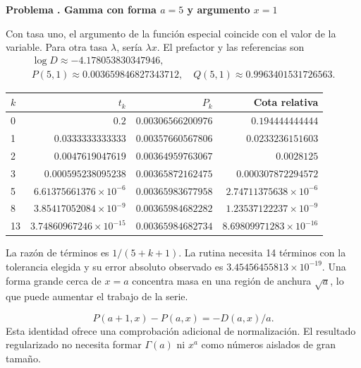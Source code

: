 \documentclass[11pt,a4paper]{article}
\theoremstyle{definition}
\newcounter{problema}
\newenvironment{resuelto}[1]{\refstepcounter{problema}\par\medskip\Needspace{6\baselineskip}\textbf{Problema \theproblema. #1}\par}{\par\medskip}
\begin{document}
\begin{resuelto}{Gamma con forma $a=5$ y argumento $x=1$}
Con tasa uno, el argumento de la función especial coincide con el valor de la variable. Para otra tasa $\lambda$, sería $\lambda x$. El prefactor y las referencias son
\[
\begin{gathered}
\log D\approx-4.178053830347946,\\
P(5,1)\approx0.003659846827343712,\quad Q(5,1)\approx0.9963401531726563.
\end{gathered}
\]

\begin{center}\small\begin{tabular}{lrrr}
\toprule
$k$ & $t_k$ & $P_k$ & Cota relativa\\\midrule
0 & $0.2$ & $0.00306566200976$ & $0.194444444444$\\
1 & $0.0333333333333$ & $0.00357660567806$ & $0.0233236151603$\\
2 & $0.0047619047619$ & $0.00364959763067$ & $0.0028125$\\
3 & $0.000595238095238$ & $0.00365872162475$ & $0.000307872294572$\\
5 & $6.61375661376\times10^{-6}$ & $0.00365983677958$ & $2.74711375638\times10^{-6}$\\
8 & $3.85417052084\times10^{-9}$ & $0.00365984682282$ & $1.23537122237\times10^{-9}$\\
13 & $3.74860967246\times10^{-15}$ & $0.00365984682734$ & $8.69809971283\times10^{-16}$\\
\bottomrule\end{tabular}\end{center}

La razón de términos es $1/(5+k+1)$. La rutina necesita 14 términos con la tolerancia elegida y su error absoluto observado es $3.45456455813\times10^{-19}$. Una forma grande cerca de $x=a$ concentra masa en una región de anchura $\sqrt a$, lo que puede aumentar el trabajo de la serie.

\[
P(a+1,x)-P(a,x)=-D(a,x)/a.
\]
Esta identidad ofrece una comprobación adicional de normalización. El resultado regularizado no necesita formar $\Gamma(a)$ ni $x^a$ como números aislados de gran tamaño.
\end{resuelto}
\end{document}
